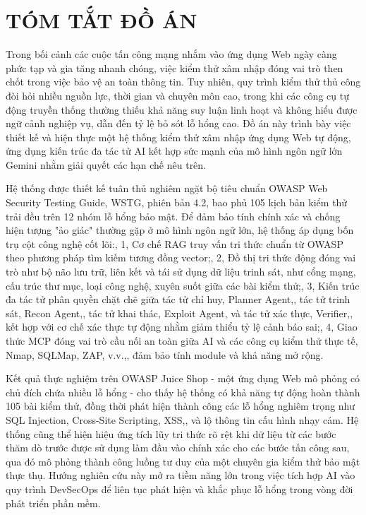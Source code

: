 \chapter*{\centering\Large{TÓM TẮT ĐỒ ÁN}}

Trong bối cảnh các cuộc tấn công mạng nhắm vào ứng dụng Web ngày càng phức tạp và gia tăng nhanh chóng, việc kiểm thử xâm nhập đóng vai trò then chốt trong việc bảo vệ an toàn thông tin. Tuy nhiên, quy trình kiểm thử thủ công đòi hỏi nhiều nguồn lực, thời gian và chuyên môn cao, trong khi các công cụ tự động truyền thống thường thiếu khả năng suy luận linh hoạt và không hiểu được ngữ cảnh nghiệp vụ, dẫn đến tỷ lệ bỏ sót lỗ hổng cao. Đồ án này trình bày việc thiết kế và hiện thực một hệ thống kiểm thử xâm nhập ứng dụng Web tự động, ứng dụng kiến trúc đa tác tử AI kết hợp sức mạnh của mô hình ngôn ngữ lớn Gemini nhằm giải quyết các hạn chế nêu trên.

Hệ thống được thiết kế tuân thủ nghiêm ngặt bộ tiêu chuẩn OWASP Web Security Testing Guide, WSTG, phiên bản 4.2, bao phủ 105 kịch bản kiểm thử trải đều trên 12 nhóm lỗ hổng bảo mật. Để đảm bảo tính chính xác và chống hiện tượng "ảo giác" thường gặp ở mô hình ngôn ngữ lớn, hệ thống áp dụng bốn trụ cột công nghệ cốt lõi:, 1, Cơ chế RAG truy vấn tri thức chuẩn từ OWASP theo phương pháp tìm kiếm tương đồng vector;, 2, Đồ thị tri thức động đóng vai trò như bộ não lưu trữ, liên kết và tái sử dụng dữ liệu trinh sát, như cổng mạng, cấu trúc thư mục, loại công nghệ, xuyên suốt giữa các bài kiểm thử;, 3, Kiến trúc đa tác tử phân quyền chặt chẽ giữa tác tử chỉ huy, Planner Agent,, tác tử trinh sát, Recon Agent,, tác tử khai thác, Exploit Agent, và tác tử xác thực, Verifier,, kết hợp với cơ chế xác thực tự động nhằm giảm thiểu tỷ lệ cảnh báo sai;, 4, Giao thức MCP đóng vai trò cầu nối an toàn giữa AI và các công cụ kiểm thử thực tế, Nmap, SQLMap, ZAP, v.v.,, đảm bảo tính module và khả năng mở rộng.

Kết quả thực nghiệm trên OWASP Juice Shop - một ứng dụng Web mô phỏng có chủ đích chứa nhiều lỗ hổng - cho thấy hệ thống có khả năng tự động hoàn thành 105 bài kiểm thử, đồng thời phát hiện thành công các lỗ hổng nghiêm trọng như SQL Injection, Cross-Site Scripting, XSS,, và lộ thông tin cấu hình nhạy cảm. Hệ thống cũng thể hiện hiệu ứng tích lũy tri thức rõ rệt khi dữ liệu từ các bước thăm dò trước được sử dụng làm đầu vào chính xác cho các bước tấn công sau, qua đó mô phỏng thành công luồng tư duy của một chuyên gia kiểm thử bảo mật thực thụ. Hướng nghiên cứu này mở ra tiềm năng lớn trong việc tích hợp AI vào quy trình DevSecOps để liên tục phát hiện và khắc phục lỗ hổng trong vòng đời phát triển phần mềm.